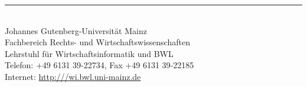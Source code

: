 \begin{titlepage}
\begin{center}

  \rule{\textwidth}{.4pt}\\ %
  Johannes Gutenberg-Universität Mainz\\
  Fachbereich Rechts- und Wirtschaftswissenschaften\\
  Lehrstuhl für Wirtschaftsinformatik und BWL\\
  Telefon: +49 6131 39-22734, Fax +49 6131 39-22185\\
  Internet: \url{http:///wi.bwl.uni-mainz.de}
\end{center}

\end{titlepage} %

